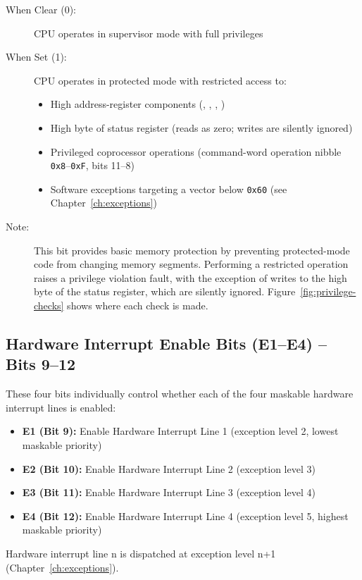 \begin{description}
	\item[When Clear (0):] CPU operates in supervisor mode with full privileges
	\item[When Set (1):] CPU operates in protected mode with restricted access to:
	      \begin{itemize}
		      \item High address-register components (, , , )
		      \item High byte of status register (reads as zero; writes are silently ignored)
		      \item Privileged coprocessor operations (command-word operation nibble \texttt{0x8}--\texttt{0xF}, bits 11--8)
		      \item Software exceptions targeting a vector below \texttt{0x60} (see Chapter~\ref{ch:exceptions})
	      \end{itemize}
	\item[Note:] This bit provides basic memory protection by preventing protected-mode code from changing memory segments.
	      Performing a restricted operation raises a privilege violation fault, with the exception of writes to the high byte of
	      the status register, which are silently ignored. Figure~\ref{fig:privilege-checks} shows where each check is made.
\end{description}

\subsection{Hardware Interrupt Enable Bits (E1--E4) -- Bits 9--12}

These four bits individually control whether each of the four maskable hardware interrupt lines is enabled:

\begin{itemize}
	\item \textbf{E1 (Bit 9):} Enable Hardware Interrupt Line 1 (exception level 2, lowest maskable priority)
	\item \textbf{E2 (Bit 10):} Enable Hardware Interrupt Line 2 (exception level 3)
	\item \textbf{E3 (Bit 11):} Enable Hardware Interrupt Line 3 (exception level 4)
	\item \textbf{E4 (Bit 12):} Enable Hardware Interrupt Line 4 (exception level 5, highest maskable priority)
\end{itemize}

Hardware interrupt line n is dispatched at exception level n+1 (Chapter~\ref{ch:exceptions}).


